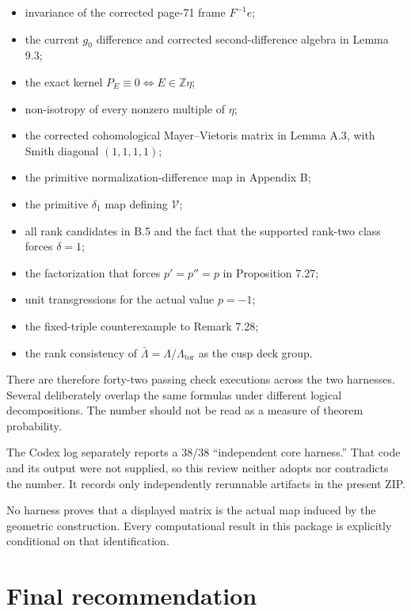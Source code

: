 \documentclass[
  10pt,
  letterpaper,
]{article}
\providecommand{\tightlist}{%
  \setlength{\itemsep}{0pt}\setlength{\parskip}{0pt}}
\begin{document}
\begin{itemize}
\tightlist
\item
  invariance of the corrected page-71 frame \(F^{-1}e\);
\item
  the current \(g_0\) difference and corrected second-difference algebra
  in Lemma 9.3;
\item
  the exact kernel \(P_E\equiv0\Longleftrightarrow E\in\mathbb Z\eta\);
\item
  non-isotropy of every nonzero multiple of \(\eta\);
\item
  the corrected cohomological Mayer--Vietoris matrix in Lemma A.3, with
  Smith diagonal \((1,1,1,1)\);
\item
  the primitive normalization-difference map in Appendix B;
\item
  the primitive \(\delta_1\) map defining \(\mathcal V\);
\item
  all rank candidates in B.5 and the fact that the supported rank-two
  class forces \(\delta=1\);
\item
  the factorization that forces \(p'=p''=p\) in Proposition 7.27;
\item
  unit transgressions for the actual value \(p=-1\);
\item
  the fixed-triple counterexample to Remark 7.28;
\item
  the rank consistency of \(\bar\Lambda=\Lambda/\Lambda_{\mathrm{tor}}\)
  as the cusp deck group.
\end{itemize}

There are therefore forty-two passing check executions across the two
harnesses. Several deliberately overlap the same formulas under
different logical decompositions. The number should not be read as a
measure of theorem probability.

The Codex log separately reports a 38/38 ``independent core harness.''
That code and its output were not supplied, so this review neither
adopts nor contradicts the number. It records only independently
rerunnable artifacts in the present ZIP.

No harness proves that a displayed matrix is the actual map induced by
the geometric construction. Every computational result in this package
is explicitly conditional on that identification.

\section{Final recommendation}\label{final-recommendation}
\end{document}
